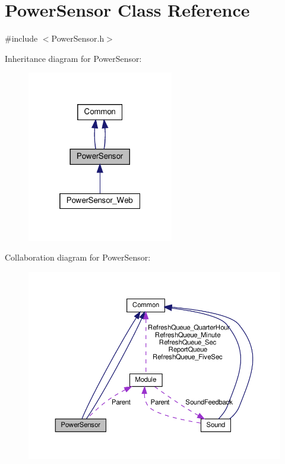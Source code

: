 \hypertarget{class_power_sensor}{}\section{Power\+Sensor Class Reference}
\label{class_power_sensor}


{\ttfamily \#include $<$Power\+Sensor.\+h$>$}



Inheritance diagram for Power\+Sensor\+:
\nopagebreak
\begin{figure}[H]
\begin{center}
\leavevmode
\includegraphics[width=181pt]{class_power_sensor__inherit__graph}
\end{center}
\end{figure}


Collaboration diagram for Power\+Sensor\+:
\nopagebreak
\begin{figure}[H]
\begin{center}
\leavevmode
\includegraphics[width=350pt]{class_power_sensor__coll__graph}
\end{center}
\end{figure}
